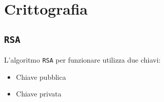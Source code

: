 \chapter{Crittografia}
\section{\texttt{RSA}}
L'algoritmo \texttt{RSA} per funzionare utilizza due chiavi:
\begin{itemize}
    \item Chiave pubblica
    \item Chiave privata
\end{itemize}